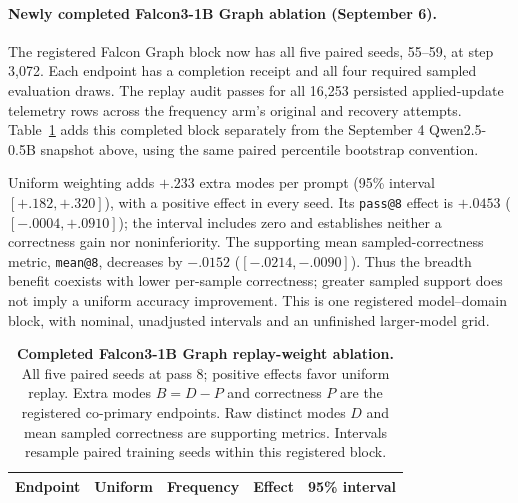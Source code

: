 \documentclass{article}
\newcommand{\1}{\mathbf 1}
\theoremstyle{remark}
\theoremstyle{definition}
\theoremstyle{plain}
\begin{document}
\paragraph{Newly completed Falcon3-1B Graph ablation (September 6).}
\label{app:e120-falcon-graph-update}
The registered Falcon Graph block now has all five paired seeds, 55--59,
at step 3,072. Each endpoint has a completion receipt and all four required
sampled evaluation draws. The replay audit passes for all 16,253 persisted
applied-update telemetry rows across the frequency arm's original and recovery
attempts. Table~\ref{tab:e120-falcon-graph} adds this completed block separately
from the September 4 Qwen2.5-0.5B snapshot above, using the same paired
percentile bootstrap convention.

Uniform weighting adds $+.233$ extra modes per prompt
(95\% interval $[+.182,+.320]$), with a positive effect in every seed.
Its \texttt{pass@8} effect is $+.0453$ ($[-.0004,+.0910]$); the interval
includes zero and establishes neither a correctness gain nor noninferiority.
The supporting mean sampled-correctness metric, \texttt{mean@8}, decreases
by $-.0152$ ($[-.0214,-.0090]$). Thus the breadth benefit coexists with
lower per-sample correctness; greater sampled support does not imply a
uniform accuracy improvement. This is one registered model--domain block,
with nominal, unadjusted intervals and an unfinished larger-model grid.

\begin{table}[H]
  \centering
  \caption{\textbf{Completed Falcon3-1B Graph replay-weight ablation.}
  All five paired seeds at pass 8; positive effects favor uniform replay.
  Extra modes $B=D-P$ and correctness $P$ are the registered co-primary
  endpoints. Raw distinct modes $D$ and mean sampled correctness are
  supporting metrics. Intervals resample paired training seeds within this registered block.}
  \label{tab:e120-falcon-graph}
  \small
  \setlength{\tabcolsep}{4pt}
  \begin{tabular}{@{}lrrrr@{}}
    \toprule
    \textbf{Endpoint} & \textbf{Uniform} & \textbf{Frequency}
      & \textbf{Effect} & \textbf{95\% interval} \\
    \midrule
    
  \end{tabular}
\end{table}
\end{document}
